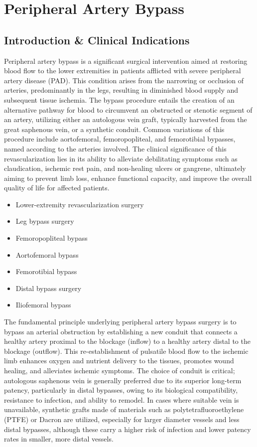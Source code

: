 \chapter{Peripheral Artery Bypass}

\section*{Introduction \& Clinical Indications}
Peripheral artery bypass is a significant surgical intervention aimed at restoring blood flow to the lower extremities in patients afflicted with severe peripheral artery disease (PAD). This condition arises from the narrowing or occlusion of arteries, predominantly in the legs, resulting in diminished blood supply and subsequent tissue ischemia. The bypass procedure entails the creation of an alternative pathway for blood to circumvent an obstructed or stenotic segment of an artery, utilizing either an autologous vein graft, typically harvested from the great saphenous vein, or a synthetic conduit. Common variations of this procedure include aortofemoral, femoropopliteal, and femorotibial bypasses, named according to the arteries involved. The clinical significance of this revascularization lies in its ability to alleviate debilitating symptoms such as claudication, ischemic rest pain, and non-healing ulcers or gangrene, ultimately aiming to prevent limb loss, enhance functional capacity, and improve the overall quality of life for affected patients.

\begin{itemize}
  \item Lower-extremity revascularization surgery
  \item Leg bypass surgery
  \item Femoropopliteal bypass
  \item Aortofemoral bypass
  \item Femorotibial bypass
  \item Distal bypass surgery
  \item Iliofemoral bypass
\end{itemize}

The fundamental principle underlying peripheral artery bypass surgery is to bypass an arterial obstruction by establishing a new conduit that connects a healthy artery proximal to the blockage (inflow) to a healthy artery distal to the blockage (outflow). This re-establishment of pulsatile blood flow to the ischemic limb enhances oxygen and nutrient delivery to the tissues, promotes wound healing, and alleviates ischemic symptoms. The choice of conduit is critical; autologous saphenous vein is generally preferred due to its superior long-term patency, particularly in distal bypasses, owing to its biological compatibility, resistance to infection, and ability to remodel. In cases where suitable vein is unavailable, synthetic grafts made of materials such as polytetrafluoroethylene (PTFE) or Dacron are utilized, especially for larger diameter vessels and less distal bypasses, although these carry a higher risk of infection and lower patency rates in smaller, more distal vessels.

